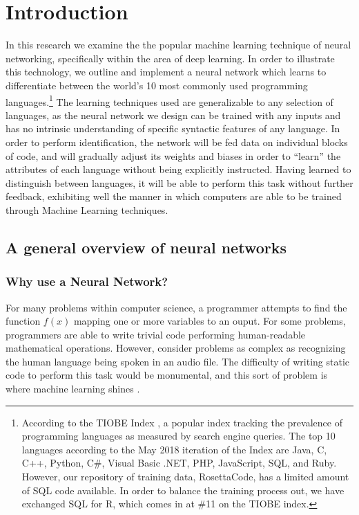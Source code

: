 \documentclass{article}
\begin{document}
\section{Introduction}
In this research we examine the the popular machine learning technique of neural networking, specifically within the area of deep learning. In order to illustrate this technology, we outline and implement a neural network which learns to differentiate between the world's 10 most commonly used programming languages.\footnote{According to the TIOBE Index \cite{tiobe}, a popular index tracking the prevalence of programming languages as measured by search engine queries. The top 10 languages according to the May 2018 iteration of the Index are Java, C, C++, Python, C\#, Visual Basic .NET, PHP, JavaScript, SQL, and Ruby. However, our repository of training data, RosettaCode, has a limited amount of SQL code available. In order to balance the training process out, we have exchanged SQL for R, which comes in at \#11 on the TIOBE index.} The learning techniques used are generalizable to any selection of languages, as the neural network we design can be trained with any inputs and has no intrinsic understanding of specific syntactic features of any language. In order to perform identification, the network will be fed data on individual blocks of code, and will gradually adjust its weights and biases in order to ``learn'' the attributes of each language without being explicitly instructed. Having learned to distinguish between languages, it will be able to perform this task without further feedback, exhibiting well the manner in which computers are able to be trained through Machine Learning techniques.

\subsection{A general overview of neural networks}
\subsubsection{Why use a Neural Network?}
For many problems within computer science, a programmer attempts to find the function $f(x)$ mapping one or more variables to an ouput. For some problems, programmers are able to write trivial code performing human-readable mathematical operations. However, consider problems as complex as recognizing the human language being spoken in an audio file. The difficulty of writing static code to perform this task would be monumental, and this sort of problem is where machine learning shines \cite{10algos}.
\end{document}
